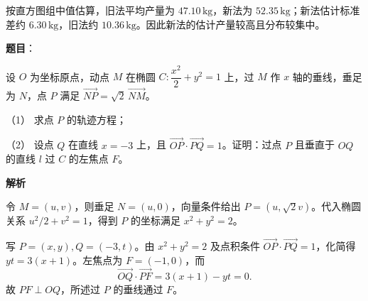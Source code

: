 \begin{answer}

按直方图组中值估算，旧法平均产量为 \(47.10\,\mathrm{kg}\)，新法为 \(52.35\,\mathrm{kg}\)；新法估计标准差约 \(6.30\,\mathrm{kg}\)，旧法约 \(10.36\,\mathrm{kg}\)。因此新法的估计产量较高且分布较集中。




\end{answer}
\begin{answer}

\textbf{题目}：

设 \(O\) 为坐标原点，动点 \(M\) 在椭圆 \(C:\dfrac{x^2}{2}+y^2=1\) 上，过 \(M\) 作 \(x\) 轴的垂线，垂足为 \(N\)，点 \(P\) 满足 \(\overrightarrow{NP}=\sqrt2\,\overrightarrow{NM}\)。

（1） 求点 \(P\) 的轨迹方程；

（2） 设点 \(Q\) 在直线 \(x=-3\) 上，且 \(\overrightarrow{OP}\cdot\overrightarrow{PQ}=1\)。证明：过点 \(P\) 且垂直于 \(OQ\) 的直线 \(l\) 过 \(C\) 的左焦点 \(F\)。

\textbf{解析}


令 \(M=(u,v)\)，则垂足 \(N=(u,0)\)，向量条件给出 \(P=(u,\sqrt2v)\)。代入椭圆关系 \(u^2/2+v^2=1\)，得到 \(P\) 的坐标满足 \(x^2+y^2=2\)。


写 \(P=(x,y),Q=(-3,t)\)。由 \(x^2+y^2=2\) 及点积条件 \(\overrightarrow{OP}\cdot\overrightarrow{PQ}=1\)，化简得 \(yt=3(x+1)\)。左焦点为 \(F=(-1,0)\)，而
\nopagebreak[4]
\[
\overrightarrow{OQ}\cdot\overrightarrow{PF}=3(x+1)-yt=0.
\]
故 \(PF\perp OQ\)，所述过 \(P\) 的垂线通过 \(F\)。



\end{answer}
